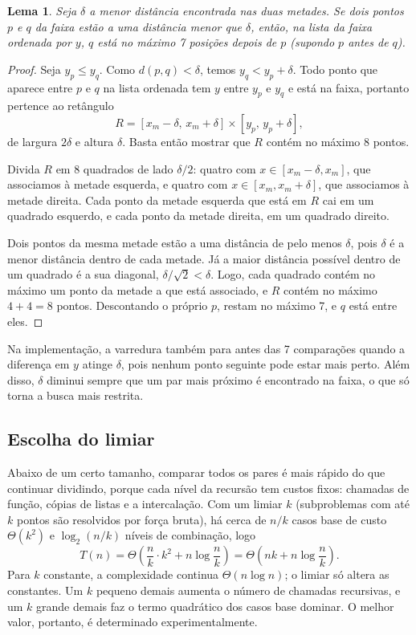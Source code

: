 \documentclass[11pt,a4paper]{article}
\newtheorem{lema}{Lema}
\begin{document}
\begin{lema}
Seja $\delta$ a menor distância encontrada nas duas metades. Se dois pontos $p$ e $q$ da faixa estão a uma distância menor que $\delta$, então, na lista da faixa ordenada por $y$, $q$ está no máximo 7 posições depois de $p$ (supondo $p$ antes de $q$).
\end{lema}

\begin{proof}
Seja $y_p \leq y_q$. Como $d(p,q) < \delta$, temos $y_q < y_p + \delta$. Todo ponto que aparece entre $p$ e $q$ na lista ordenada tem $y$ entre $y_p$ e $y_q$ e está na faixa, portanto pertence ao retângulo
\[
R = [x_m - \delta,\, x_m + \delta] \times [y_p,\, y_p + \delta],
\]
de largura $2\delta$ e altura $\delta$. Basta então mostrar que $R$ contém no máximo 8 pontos.

Divida $R$ em 8 quadrados de lado $\delta/2$: quatro com $x \in [x_m - \delta, x_m]$, que associamos à metade esquerda, e quatro com $x \in [x_m, x_m + \delta]$, que associamos à metade direita. Cada ponto da metade esquerda que está em $R$ cai em um quadrado esquerdo, e cada ponto da metade direita, em um quadrado direito.

Dois pontos da mesma metade estão a uma distância de pelo menos $\delta$, pois $\delta$ é a menor distância dentro de cada metade. Já a maior distância possível dentro de um quadrado é a sua diagonal, $\delta/\sqrt{2} < \delta$. Logo, cada quadrado contém no máximo um ponto da metade a que está associado, e $R$ contém no máximo $4 + 4 = 8$ pontos. Descontando o próprio $p$, restam no máximo 7, e $q$ está entre eles.
\end{proof}

Na implementação, a varredura também para antes das 7 comparações quando a diferença em $y$ atinge $\delta$, pois nenhum ponto seguinte pode estar mais perto. Além disso, $\delta$ diminui sempre que um par mais próximo é encontrado na faixa, o que só torna a busca mais restrita.

\subsection{Escolha do limiar}

Abaixo de um certo tamanho, comparar todos os pares é mais rápido do que continuar dividindo, porque cada nível da recursão tem custos fixos: chamadas de função, cópias de listas e a intercalação. Com um limiar $k$ (subproblemas com até $k$ pontos são resolvidos por força bruta), há cerca de $n/k$ casos base de custo $\Theta(k^2)$ e $\log_2(n/k)$ níveis de combinação, logo
\[
T(n) = \Theta\!\left(\frac{n}{k}\cdot k^2 + n\log\frac{n}{k}\right) = \Theta\!\left(nk + n\log\frac{n}{k}\right).
\]
Para $k$ constante, a complexidade continua $\Theta(n\log n)$; o limiar só altera as constantes. Um $k$ pequeno demais aumenta o número de chamadas recursivas, e um $k$ grande demais faz o termo quadrático dos casos base dominar. O melhor valor, portanto, é determinado experimentalmente.
\end{document}
